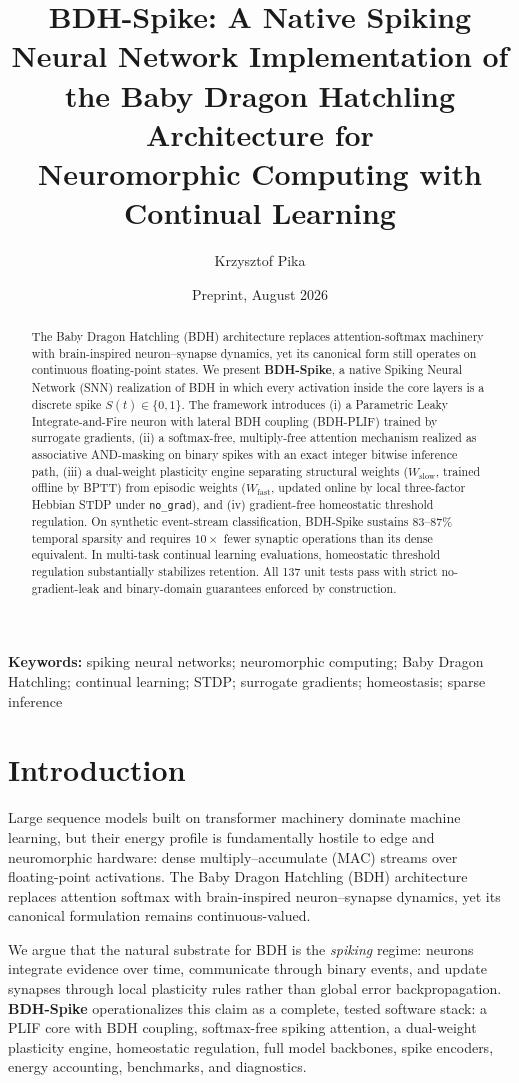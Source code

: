 \documentclass[11pt]{article}
\title{\textbf{BDH-Spike: A Native Spiking Neural Network Implementation of\\
the Baby Dragon Hatchling Architecture for\\
Neuromorphic Computing with Continual Learning}}
\author{Krzysztof Pika}
\date{Preprint, August 2026}
\newcommand{\Wslow}{W_{\text{slow}}}
\newcommand{\Wfast}{W_{\text{fast}}}
\begin{document}
\maketitle

\begin{abstract}
The Baby Dragon Hatchling (BDH) architecture replaces attention-softmax
machinery with brain-inspired neuron--synapse dynamics, yet its canonical
form still operates on continuous floating-point states. We present
\textbf{BDH-Spike}, a native Spiking Neural Network (SNN) realization of BDH
in which every activation inside the core layers is a discrete spike
$S(t)\in\{0,1\}$. The framework introduces (i) a Parametric Leaky
Integrate-and-Fire neuron with lateral BDH coupling (BDH-PLIF) trained by
surrogate gradients, (ii) a softmax-free, multiply-free attention mechanism
realized as associative AND-masking on binary spikes with an exact integer
bitwise inference path, (iii) a dual-weight plasticity engine separating
structural weights ($\Wslow$, trained offline by BPTT) from episodic weights
($\Wfast$, updated online by local three-factor Hebbian STDP under
\texttt{no\_grad}), and (iv) gradient-free homeostatic threshold regulation.
On synthetic event-stream classification, BDH-Spike sustains 83--87\%
temporal sparsity and requires $10\times$ fewer synaptic operations than
its dense equivalent. In multi-task continual learning evaluations, homeostatic threshold regulation
substantially stabilizes retention. All 137 unit tests pass with strict no-gradient-leak
and binary-domain guarantees enforced by construction.
\end{abstract}

\noindent\textbf{Keywords:} spiking neural networks; neuromorphic computing;
Baby Dragon Hatchling; continual learning; STDP; surrogate gradients;
homeostasis; sparse inference

\section{Introduction}
Large sequence models built on transformer machinery dominate machine
learning, but their energy profile is fundamentally hostile to edge and
neuromorphic hardware: dense multiply--accumulate (MAC) streams over
floating-point activations. The Baby Dragon Hatchling (BDH) architecture
\cite{bdh} replaces attention softmax with brain-inspired neuron--synapse
dynamics, yet its canonical formulation remains continuous-valued.

We argue that the natural substrate for BDH is the \emph{spiking} regime:
neurons integrate evidence over time, communicate through binary events, and
update synapses through local plasticity rules rather than global error
backpropagation. \textbf{BDH-Spike} operationalizes this claim as a complete,
tested software stack: a PLIF core with BDH coupling, softmax-free spiking
attention, a dual-weight plasticity engine, homeostatic regulation, full
model backbones, spike encoders, energy accounting, benchmarks, and
diagnostics.
\end{document}
